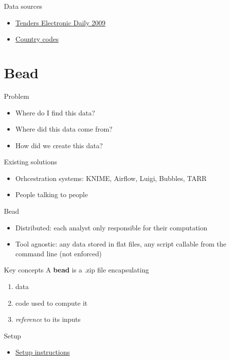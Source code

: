 \documentclass[
  ignorenonframetext,
  aspectratio=54,
]{beamer}
\providecommand{\tightlist}{%
  \setlength{\itemsep}{0pt}\setlength{\parskip}{0pt}}
\begin{document}
\begin{frame}{Data sources}
\protect\hypertarget{data-sources}{}
\begin{itemize}
\tightlist
\item
  \href{https://data.europa.eu/euodp/en/data/dataset/ted-csv/resource/7caee4eb-0fc0-4fc0-ad1a-c970e63b40b4}{Tenders
  Electronic Daily 2009}
\item
  \href{https://www.datahub.io/core/country-codes}{Country codes}
\end{itemize}
\end{frame}

\hypertarget{bead}{%
\section{Bead}\label{bead}}

\begin{frame}{Problem}
\protect\hypertarget{problem}{}
\begin{itemize}
\tightlist
\item
  Where do I find this data?
\item
  Where did this data come from?
\item
  How did we create this data?
\end{itemize}
\end{frame}

\begin{frame}{Existing solutions}
\protect\hypertarget{existing-solutions}{}
\begin{itemize}
\tightlist
\item
  Orhcestration systems: KNIME, Airflow, Luigi, Bubbles, TARR
\item
  People talking to people
\end{itemize}
\end{frame}

\begin{frame}{Bead}
\protect\hypertarget{bead-1}{}
\begin{itemize}
\tightlist
\item
  Distributed: each analyst only responsible for their computation
\item
  Tool agnostic: any data stored in flat files, any script callable from
  the command line (not enforced)
\end{itemize}
\end{frame}

\begin{frame}{Key concepts}
\protect\hypertarget{key-concepts}{}
A \textbf{bead} is a .zip file encapsulating

\begin{enumerate}
\tightlist
\item
  data
\item
  code used to compute it
\item
  \emph{reference} to its inputs
\end{enumerate}
\end{frame}

\begin{frame}{Setup}
\protect\hypertarget{setup}{}
\begin{itemize}
\tightlist
\item
  \href{https://handbook.microdata.io/onboarding/setup\#bead}{Setup
  instructions}
\end{itemize}
\end{frame}
\end{document}
